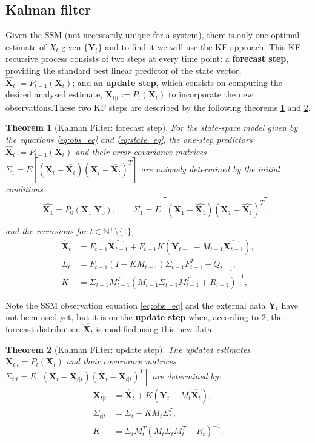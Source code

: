 \documentclass{article}
\newtheorem{theorem}{Theorem}[section]
\theoremstyle{definition}
\theoremstyle{definition}
\theoremstyle{remark}
\theoremstyle{mythmstyle}
\begin{document}
\subsection{Kalman filter}

Given the SSM (not necessarily unique for a system), there is only one optimal estimate of $X_t$ given $\{\textbf{Y}_t\}$ and to find it we will use the KF approach. This KF recursive process consists of two steps at every time point: a \textbf{forecast step}, providing the standard best linear predictor of the state vector, $\hat{\textbf{X}}_t:=P_{t-1}(\bm{X}_t)$; and an \textbf{update step}, which consists on computing the desired analysed estimate, $\textbf{X}_{t|t}:=P_{t}(\bm{X}_t)$ to incorporate the new observations.These two KF steps are described by the following theorems \ref{teor:forecast} and \ref{teor:update}. 
\begin{theorem}[Kalman Filter: forecast step]\label{teor:forecast}
For the state-space model given by the equations \eqref{eq:obs_eq} and \eqref{eq:state_eq}, the one-step predictors $\hat{\textbf{X}}_t:=P_{t-1}(\textbf{X}_t)$ and their error covariance matrices $\Sigma_t = E\left[ (\textbf{X}_t - \hat{\textbf{X}_t})(\textbf{X}_t - \hat{\textbf{X}_t})^T \right]$ are uniquely determined by the initial conditions
\begin{align*}
    \hat{\textbf{X}_1} = P_0(\textbf{X}_1|\textbf{Y}_0), \quad \quad \Sigma_1 = E\left[ (\textbf{X}_1 - \hat{\textbf{X}_1})(\textbf{X}_1 - \hat{\textbf{X}_1})^T \right],
\end{align*}
and the recursions for $t\in \mathbb{N}^{+} \setminus \{1\}$, 
\begin{align}
    \widehat{\textbf{X}}_{t} &= F_{t-1} \widehat{\textbf{X}_{t-1}} + F_{t-1} K(\textbf{Y}_{t-1} - M_{t-1} \widehat{\textbf{X}_{t-1}}),\\
    \Sigma_{t} &= F_{t-1} (I-K M_{t-1})  \Sigma_{t-1}F_{t-1}^T+ Q_{t-1}, \label{KP2} \\
    K&= \Sigma_{t-1} M_{t-1}^T(M_{t-1}\Sigma_{t-1} M_{t-1}^T+ R_{t-1})^{-1},
\end{align}
\end{theorem}

Note the SSM observation equation \ref{eq:obs_eq} and the external data $\textbf{Y}_t$ have not been used yet, but it is on the \textbf{update step} when, according to \ref{teor:update}, the forecast distribution $\widehat{\textbf{X}_t}$ is modified using this new data.

\begin{theorem}[Kalman Filter: update step]\label{teor:update}
The updated estimates $\textbf{X}_{t|t} = P_t(\textbf{X}_t)$ and their covariance matrices $\Sigma_{t|t}= E\left[ (\textbf{X}_t - \textbf{X}_{t|t})(\textbf{X}_t - \textbf{X}_{t|t})^T \right] $ are determined by:
\begin{align}
    \textbf{X}_{t|t}&=\hat{\textbf{X}}_t + K (\textbf{Y}_t - M_t \hat{\textbf{X}_t}), \label{KFteo1}\\
   \Sigma_{t|t}&= \Sigma_t - K M_t \Sigma_t^T,  \label{KFteo2}\\
   K&= \Sigma_t M_t^T(M_t\Sigma_t M_t^T+ R_t)^{-1}.
\end{align}
\end{theorem}
\end{document}
